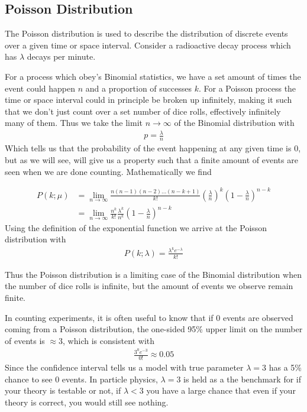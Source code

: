 \subsection{Poisson Distribution}
The Poisson distribution is used to describe the distribution of discrete events over a given time or space interval. Consider a radioactive decay process which has $\lambda$ decays per minute. 

For a process which obey's Binomial statistics, we have a set amount of times the event could happen $n$ and a proportion of successes $k$. For a Poisson process the time or space interval could in principle be broken up infinitely, making it such that we don't just count over a set number of dice rolls, effectively infinitely many of them. Thus we take the limit $n\rightarrow \infty$ of the Binomial distribution with
\begin{align}
p = \frac{\lambda}{n}
\end{align}
Which tells us that the probability of the event happening at any given time is $0$, but as we will see, will give us a property such that a finite amount of events are seen when we are done counting. Mathematically we find

\begin{align}
P(k; \mu) &= \lim_{n\to \infty} \frac{n(n-1)(n-2)...(n-k+1)}{k!}\left(\frac{\lambda}{n}\right)^k\left(1-\frac{\lambda}{n}\right)^{n-k}\\
&= \lim_{n\to \infty}\frac{n^k}{k!}\frac{\lambda^k}{n^k}\left(1-\frac{\lambda}{n}\right)^{n-k}
\end{align}
Using the definition of the exponential function we arrive at the Poisson distribution with
\begin{align}
P(k; \lambda) = \frac{\lambda^ke^{-\lambda}}{k!}
\end{align}

Thus the Poisson distribution is a limiting case of the Binomial distribution when the number of dice rolls is infinite, but the amount of events we observe remain finite.

In counting experiments, it is often useful to know that if 0 events are observed coming from a Poisson distribution, the one-sided 95\% upper limit on the number of events is $\approx 3$, which is consistent with
\begin{align}
	\frac{3^0e^{-3}}{0!} \approx 0.05
\end{align}
Since the confidence interval tells us a model with true parameter $\lambda=3$ has a 5\% chance to see 0 events. In particle physics, $\lambda=3$ is held as a the benchmark for if your theory is testable or not, if $\lambda < 3$ you have a large chance that even if your theory is correct, you would still see nothing. 



